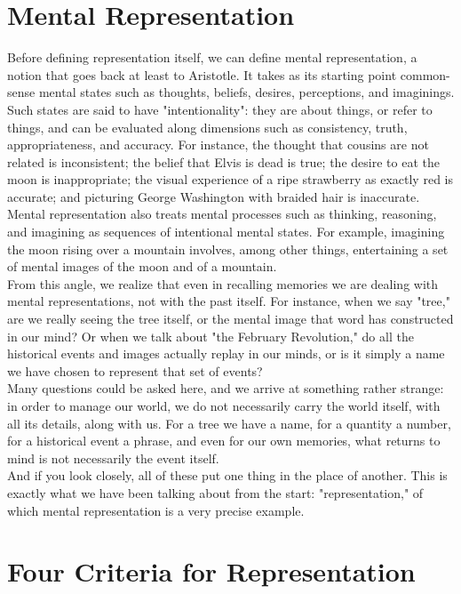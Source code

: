 \section{Mental Representation}
\label{sec:mental-representation}
Before defining representation itself, we can define mental representation, a notion that goes back at least to Aristotle. It takes as its starting point common-sense mental states such as thoughts, beliefs, desires, perceptions, and imaginings. Such states are said to have "intentionality": they are about things, or refer to things, and can be evaluated along dimensions such as consistency, truth, appropriateness, and accuracy. For instance, the thought that cousins are not related is inconsistent; the belief that Elvis is dead is true; the desire to eat the moon is inappropriate; the visual experience of a ripe strawberry as exactly red is accurate; and picturing George Washington with braided hair is inaccurate\autocite{sep-mental-representation}.
\newpage Mental representation also treats mental processes such as thinking, reasoning, and imagining as sequences of intentional mental states. For example, imagining the moon rising over a mountain involves, among other things, entertaining a set of mental images of the moon and of a mountain\autocite{sep-mental-representation}.\\
From this angle, we realize that even in recalling memories we are dealing with mental representations, not with the past itself. For instance, when we say "tree," are we really seeing the tree itself, or the mental image that word has constructed in our mind? Or when we talk about "the February Revolution," do all the historical events and images actually replay in our minds, or is it simply a name we have chosen to represent that set of events?\\
Many questions could be asked here, and we arrive at something rather strange: in order to manage our world, we do not necessarily carry the world itself, with all its details, along with us. For a tree we have a name, for a quantity a number, for a historical event a phrase, and even for our own memories, what returns to mind is not necessarily the event itself.\\
And if you look closely, all of these put one thing in the place of another. This is exactly what we have been talking about from the start: "representation," of which mental representation is a very precise example.

\section{Four Criteria for Representation}
\label{sec:four-criteria-representation}


